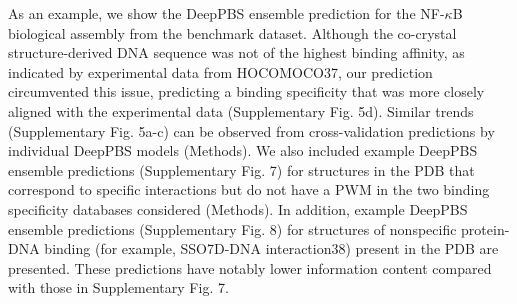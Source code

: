 \par
As an example, we show the DeepPBS ensemble prediction for the NF-$\kappa$B biological assembly from the benchmark dataset. Although the co-crystal structure-derived DNA sequence was not of the highest binding affinity, as indicated by experimental data from HOCOMOCO37, our prediction circumvented this issue, predicting a binding specificity that was more closely aligned with the experimental data (Supplementary Fig. 5d). Similar trends (Supplementary Fig. 5a-c) can be observed from cross-validation predictions by individual DeepPBS models (Methods). We also included example DeepPBS ensemble predictions (Supplementary Fig. 7) for structures in the PDB that correspond to specific interactions but do not have a PWM in the two binding specificity databases considered (Methods). In addition, example DeepPBS ensemble predictions (Supplementary Fig. 8) for structures of nonspecific protein-DNA binding (for example, SSO7D-DNA interaction38) present in the PDB are presented. These predictions have notably lower information content compared with those in Supplementary Fig. 7.

